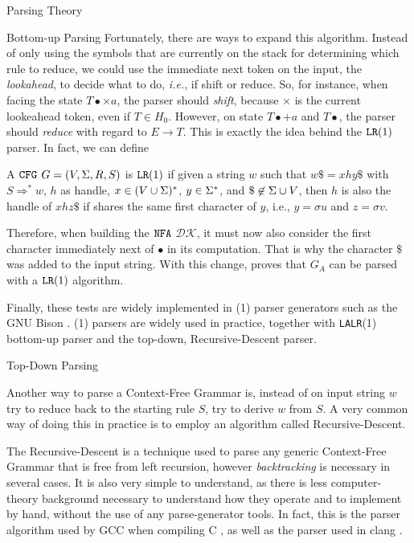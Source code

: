 \begin{section}{Parsing Theory}
\begin{subsection}{Bottom-up Parsing}
Fortunately, there are ways to expand this algorithm.
Instead of only using the symbols that are currently on the stack for
determining which rule to reduce, we could use the immediate next
token on the input, the \textit{lookahead}, to decide what to do, \textit{i.e.},
if shift or reduce. So, for instance, when facing the state
$T\bullet \times a$, the parser should \textit{shift}, because
$\times$ is the current lookeahead token, even if $T \in H_0$.
However, on state $T\bullet + a$ and $T\bullet$, the parser should
\textit{reduce} with regard to $E \rightarrow T$. This is exactly the
idea behind the $\texttt{LR}(1)$ parser. In fact, we can define

\begin{definition}
A $\texttt{CFG}$ $G = (V, \Sigma, R, S)$ is $\texttt{LR}(1)$ if given a string
$w$ such that $w\$ = xhy \$$ with $S \Rightarrow^* w$, $h$ as
handle, $x \in (V \cup \Sigma)^*$, $y \in \Sigma^*$, and $ \$ \not\in \Sigma \cup V$,
then $h$ is also the handle of $xhz\$ $ if shares the same first character of $y$, i.e.,
$y = \sigma u$ and $z = \sigma v$.
\end{definition}

Therefore, when building the $\texttt{NFA}$ $\mathcal{DK}$, it must now also
consider the first character immediately next of $\bullet$ in its computation.
That is why the character $\$$ was added to the input string.
With this change, \cite{sipser2012} proves that $G_A$ can be parsed with a
$\texttt{LR}(1)$ algorithm.

Finally, these tests are widely implemented in (1) parser generators
such as the GNU Bison \citep{manual21bison}. (1) parsers are widely
used in practice, together with \texttt{LALR}(1) bottom-up parser and the top-down,
Recursive-Descent parser.

\end{subsection}

\begin{subsection}{Top-Down Parsing}

Another way to parse a Context-Free Grammar is, instead of on input string $w$
try to reduce back to the starting rule $S$, try to derive $w$ from $S$.
A very common way of doing this in practice is to employ an algorithm called
Recursive-Descent.

The Recursive-Descent is a technique used to parse any generic Context-Free
Grammar that is free from left recursion, however \textit{backtracking} is
necessary in several cases. It is also very simple to understand, as there is
less computer-theory background necessary to understand how they operate and to
implement by hand, without the use of any parse-generator tools. In fact, this
is the parser algorithm used by GCC when compiling C \citep{myers_parser}, as
well as the parser used in clang \citep{clang_parser}. 


\end{subsection}
\end{section}
